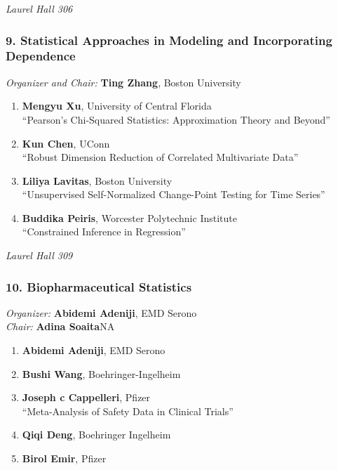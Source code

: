 \emph{Laurel Hall 306} \\[.5em]

\subsubsection*{9. Statistical Approaches in Modeling and Incorporating Dependence}

\emph{Organizer and Chair:} \textbf{Ting Zhang}, Boston University

\begin{enumerate}
\item \textbf{Mengyu Xu}, University of Central Florida \\
``Pearson’s Chi-Squared Statistics: Approximation Theory and Beyond''
\item \textbf{Kun Chen}, UConn \\
``Robust Dimension Reduction of Correlated Multivariate Data''
\item \textbf{Liliya Lavitas}, Boston University \\
``Unsupervised Self-Normalized Change-Point Testing for Time Series''
\item \textbf{Buddika Peiris}, Worcester Polytechnic Institute \\
``Constrained Inference in Regression''
\end{enumerate}

\emph{Laurel Hall 309} \\[.5em]

\subsubsection*{10. Biopharmaceutical Statistics}

\emph{Organizer:} \textbf{Abidemi Adeniji}, EMD Serono \\
\emph{Chair:} \textbf{Adina Soaita}NA

\begin{enumerate}
\item \textbf{Abidemi Adeniji}, EMD Serono 
\item \textbf{Bushi Wang}, Boehringer-Ingelheim 
\item \textbf{Joseph c Cappelleri}, Pfizer \\
``Meta-Analysis of Safety Data in Clinical Trials''
\item \textbf{Qiqi Deng}, Boehringer Ingelheim 
\item \textbf{Birol Emir}, Pfizer 
\end{enumerate}

